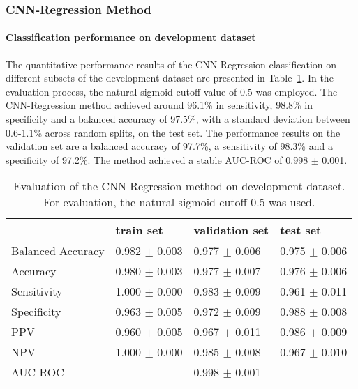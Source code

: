 \subsubsection{CNN-Regression Method}
\label{subsubsec:eval_regression}



\paragraph{Classification performance on development dataset}

The quantitative performance results of the CNN-Regression classification on 
different subsets of the development dataset are presented in Table~\ref{t1:cnn_regression_perf_eval_table}.
In the evaluation process, the natural sigmoid cutoff value of $0.5$ was employed.
The CNN-Regression method achieved around 96.1\% in sensitivity, 98.8\% in specificity and a balanced accuracy of 97.5\%, 
with a standard deviation between 0.6-1.1\% across random splits, on the test set.
The performance results on the validation set are a balanced accuracy of 97.7\%, a sensitivity of 98.3\% 
and a specificity of 97.2\%.
The method achieved a stable AUC-ROC of 0.998 $\pm$ 0.001.


\begin{table}[ht]
  \caption{Evaluation of the CNN-Regression method on development dataset. 
  For evaluation, the natural sigmoid cutoff $0.5$ was used.}
  \centering
  \begin{tabular}{llll}
      \hline
                        & train set         & validation set      & test set             \\
      \hline
      Balanced Accuracy & 0.982 $\pm$ 0.003   &  0.977 $\pm$ 0.006    &  0.975 $\pm$ 0.006 \\
      Accuracy          & 0.980 $\pm$ 0.003     &   0.977 $\pm$ 0.007   &  0.976 $\pm$ 0.006  \\
      Sensitivity       &  1.000 $\pm$ 0.000   &   0.983 $\pm$ 0.009   &  0.961 $\pm$ 0.011 \\
      Specificity       &   0.963 $\pm$ 0.005  &   0.972 $\pm$ 0.009 &   0.988 $\pm$ 0.008 \\
      PPV               &  0.960 $\pm$ 0.005    &   0.967 $\pm$ 0.011  &  0.986 $\pm$ 0.009  \\
      NPV               &  1.000 $\pm$ 0.000  &   0.985 $\pm$ 0.008   & 0.967 $\pm$ 0.010 \\
      \hline
      AUC-ROC          &   -              & 0.998 $\pm$ 0.001 & -   \\
      \hline
  \end{tabular}
 \label{t1:cnn_regression_perf_eval_table}
\end{table}


